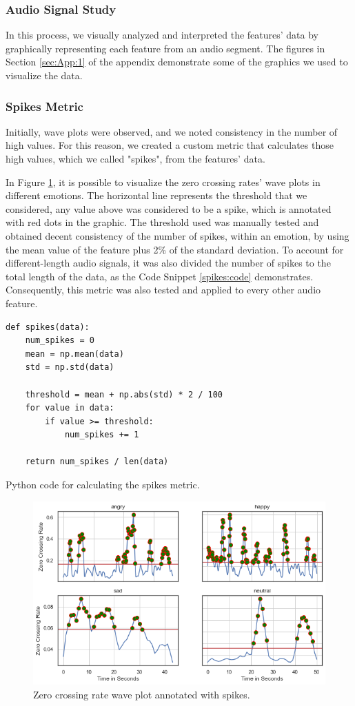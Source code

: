 \subsubsection{Audio Signal Study}

In this process, we visually analyzed and interpreted the features' data by graphically representing each feature from an audio segment. The figures in Section \ref{sec:App:1} of the appendix demonstrate some of the graphics we used to visualize the data.

\subsubsection{Spikes Metric}

Initially, wave plots were observed, and we noted consistency in the number of high values. For this reason, we created a custom metric that calculates those high values, which we called "spikes", from the features' data.

In Figure \ref{fig:zcrSpikes}, it is possible to visualize the zero crossing rates' wave plots in different emotions. The horizontal line represents the threshold that we considered, any value above was considered to be a spike, which is annotated with red dots in the graphic. The threshold used was manually tested and obtained decent consistency of the number of spikes, within an emotion, by using the mean value of the feature plus 2\% of the standard deviation. To account for different-length audio signals, it was also divided the number of spikes to the total length of the data, as the Code Snippet \ref{spikes:code} demonstrates. Consequently, this metric was also tested and applied to every other audio feature.

\begin{listing}[H]
	\begin{verbatim}
def spikes(data):
	num_spikes = 0
	mean = np.mean(data)
	std = np.std(data)
	
	threshold = mean + np.abs(std) * 2 / 100
	for value in data:
		if value >= threshold:
			num_spikes += 1

	return num_spikes / len(data)
	\end{verbatim}
	\caption{Python code for calculating the spikes metric.}
	\label{spikes:code}
\end{listing}

\begin{figure}[H]
	\centering
	\includegraphics[width=.7\textwidth]{figs/4_1_traditional/zcr_waveplot_spikes.png}
	\caption{Zero crossing rate wave plot annotated with spikes.}
	\label{fig:zcrSpikes}
\end{figure}


